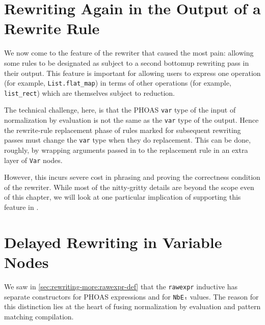 
\section{Rewriting Again in the Output of a Rewrite Rule}\label{sec:rewriting-more:do-again}
We now come to the feature of the rewriter that caused the most pain: allowing some rules to be designated as subject to a second bottomup rewriting pass in their output.
This feature is important for allowing users to express one operation (for example, \texttt{List.flat_map}) in terms of other operations (for example, \texttt{list_rect}) which are themselves subject to reduction.

The technical challenge, here, is that the PHOAS \texttt{var} type of the input of normalization by evaluation is not the same as the \texttt{var} type of the output.
Hence the rewrite-rule replacement phase of rules marked for subsequent rewriting passes must change the \texttt{var} type when they do replacement.
This can be done, roughly, by wrapping arguments passed in to the replacement rule in an extra layer of \texttt{Var} nodes.

However, this incurs severe cost in phrasing and proving the correctness condition of the rewriter.
While most of the nitty-gritty details are beyond the scope even of this chapter, we will look at one particular implication of supporting this feature in .

\section{Delayed Rewriting in Variable Nodes}\label{sec:rewriting-more:delayed-rewriting}
We saw in \autoref{sec:rewriting-more:rawexpr-def} that the \texttt{rawexpr} inductive has separate constructors for PHOAS expressions and for \texttt{NbEₜ} values.
The reason for this distinction lies at the heart of fusing normalization by evaluation and pattern matching compilation.

